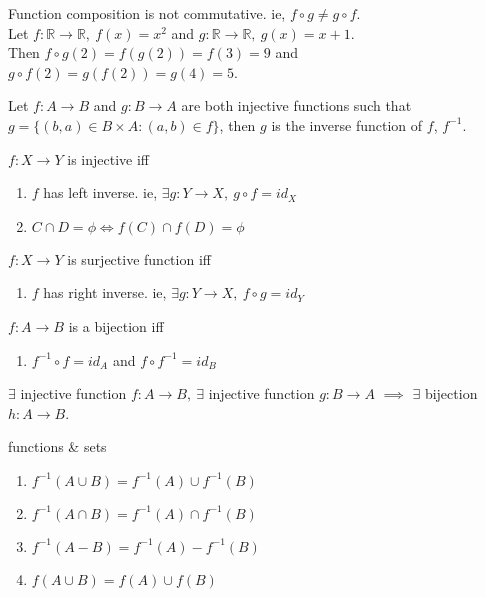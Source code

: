 	\begin{remark}
		Function composition is not commutative. ie, $f\circ g \ne g \circ f$.\\
		Let $f : \mathbb{R} \to \mathbb{R},\ f(x) = x^2$ and $g : \mathbb{R} \to \mathbb{R},\ g(x) = x+1$.\\
		Then $f\circ g(2) = f(g(2))= f(3) = 9$ and $g\circ f(2) = g(f(2))=g(4)=5$.
	\end{remark}

	\begin{definition}
		Let $f : A \to B$ and $g : B \to A$ are both injective functions such that $g = \{ (b,a) \in B \times A : (a,b) \in f \}$, then $g$ is the inverse function of $f$, $f^{-1}$.
	\end{definition}

	\begin{remark}
		$f : X \to Y$ is injective iff
		\begin{enumerate}
			\item $f$ has left inverse. ie, $\exists g:Y\to X,\ g\circ f = id_X$
			\item $C \cap D = \phi \iff f(C) \cap f(D) = \phi$
		\end{enumerate}
	\end{remark}

	\begin{remark}
		$f : X \to Y$ is surjective function iff
		\begin{enumerate}
			\item $f$ has right inverse. ie, $\exists g:Y\to X,\ f\circ g = id_Y$
		\end{enumerate}
	\end{remark}

	\begin{remark}
		$f:A \to B$ is a bijection iff 
		\begin{enumerate}
			\item $f^{-1}\circ f = id_A$ and $f\circ f^{-1} = id_B$
		\end{enumerate}
	\end{remark}

	\begin{theorem}
		$\exists$ injective function $f:A \to B,\ \exists$ injective function $g:B \to A$ $\implies$ $\exists$ bijection $h:A \to B$.
	\end{theorem}

	\begin{remark} functions \& sets
		\begin{enumerate}
		 \item $f^{-1}(A\cup B) = f^{-1}(A) \cup f^{-1}(B)$
		 \item $f^{-1}(A\cap B) = f^{-1}(A) \cap f^{-1}(B)$
		 \item $f^{-1}(A-B) = f^{-1}(A)-f^{-1}(B)$
		 \item $f(A\cup B) = f(A) \cup f(B)$
		\end{enumerate}
	\end{remark}


